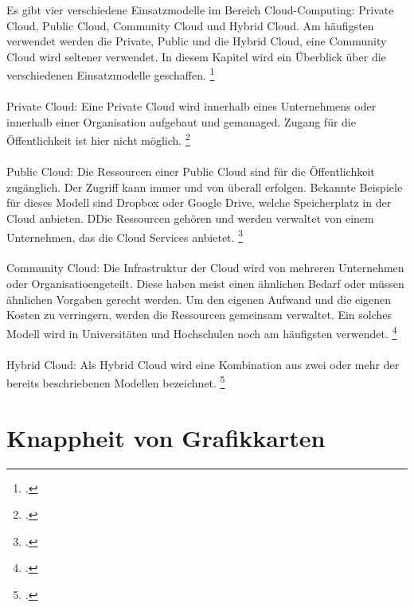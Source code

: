 \documentclass[12pt,toc=bib,toc=listof]{scrreprt}
\begin{document}
Es gibt vier verschiedene Einsatzmodelle im Bereich Cloud-Computing: Private Cloud, Public Cloud, Community Cloud 
und Hybrid Cloud. Am häufigsten verwendet werden die Private, Public und die Hybrid Cloud, eine Community Cloud 
wird seltener verwendet. In diesem Kapitel wird ein Überblick über die verschiedenen Einsatzmodelle geschaffen. \footcite [Vgl.] [] {Almubaddel.2016}
\\ \\ 
Private Cloud: Eine Private Cloud wird innerhalb eines Unternehmens oder innerhalb einer Organisation aufgebaut 
und gemanaged. Zugang für die Öffentlichkeit ist hier nicht möglich. \footcite [Vgl.] [] {Almubaddel.2016}
 \\ \\
Public Cloud: Die Ressourcen einer Public Cloud sind für die Öffentlichkeit zugänglich. Der Zugriff kann 
immer und von überall erfolgen. Bekannte Beispiele für dieses Modell sind Dropbox oder Google Drive, welche 
Speicherplatz in der Cloud anbieten.
 DDie Ressourcen gehören und werden verwaltet von einem Unternehmen, das die Cloud Services anbietet. \footcite [Vgl.] [] {Almubaddel.2016}
 \\ \\ 
Community Cloud: Die Infrastruktur der Cloud wird von mehreren Unternehmen oder Organisatioengeteilt.
 Diese haben meist einen ähnlichen Bedarf oder müssen ähnlichen Vorgaben gerecht werden. Um den eigenen Aufwand 
 und die eigenen Kosten zu verringern, werden die Ressourcen gemeinsam verwaltet. Ein solches Modell wird in 
 Universitäten und Hochschulen noch am häufigsten verwendet. \footcite [Vgl.] [] {Almubaddel.2016}
\\ \\  
Hybrid Cloud: Als Hybrid Cloud wird eine Kombination aus zwei oder mehr der bereits
 beschriebenen Modellen bezeichnet. \footcite [Vgl.] [] {Almubaddel.2016}

\chapter{Knappheit von Grafikkarten} %
\label{sec:Knappheit von Grafikkarten}
\end{document}
